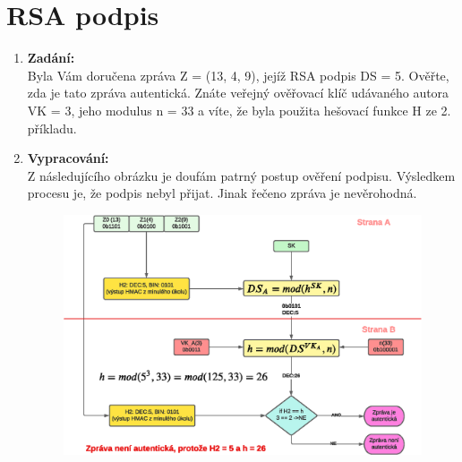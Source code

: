 \documentclass[10pt, a4paper]{article}%
\begin{document}
		\section*{\large{\textbf{RSA podpis}}}
		\begin{enumerate}
			\item \textbf{Zadání:}\\
				Byla Vám doručena zpráva Z = (13, 4, 9), jejíž RSA podpis DS = 5. Ověřte, zda je tato zpráva
				autentická. Znáte veřejný ověřovací klíč udávaného autora VK = 3, jeho modulus n = 33 a víte, že
				byla použita hešovací funkce H ze 2. příkladu.
			\item \textbf{Vypracování:}\\
				Z následujícího obrázku je doufám patrný postup ověření podpisu. Výsledkem procesu je, že podpis
				nebyl přijat. Jinak řečeno zpráva je nevěrohodná.\\
				\begin{figure}[ht!]
					\centering
					\includegraphics[width = 1\textwidth]{RSA_drawing.eps}
				\end{figure}

		\end{enumerate}
	\clearpage
\end{document}
